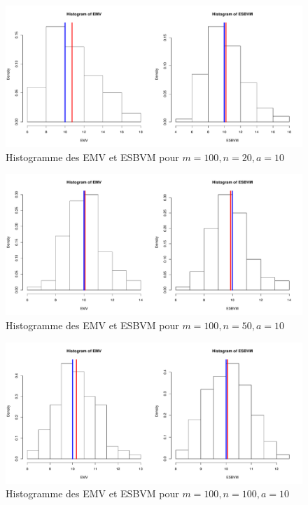 \documentclass[12pt]{article}
\begin{document}
\begin{enumerate}
\begin{figure}[!h]
\centering
\includegraphics[width=1.0\textwidth]{figures/GraphP2Q32.pdf}
\caption{Histogramme des EMV et ESBVM pour $m=100, n=20,   a=10$}
\end{figure}

\begin{figure}[!h]
\centering
\includegraphics[width=1.0\textwidth]{figures/GraphP2Q33.pdf}
\caption{Histogramme des EMV et ESBVM pour $m=100, n=50, a=10$}
\end{figure}

\begin{figure}[!h]
\centering
\includegraphics[width=1.0\textwidth]{figures/GraphP2Q34.pdf}
\caption{Histogramme des EMV et ESBVM pour $m=100, n=100, a=10$}
\end{figure}


\end{enumerate}
\end{document}
